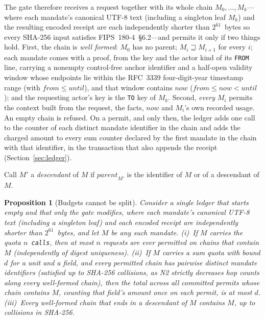 \documentclass[10pt,twocolumn]{article}
\theoremstyle{plain}
\newtheorem{proposition}[theorem]{Proposition}
\theoremstyle{definition}
\newcommand{\covers}{\sqsupseteq}
\begin{document}
The gate therefore receives a request together with its whole chain $M_0, \dots, M_k$---where each mandate's canonical UTF-8 text (including a singleton leaf $M_k$) and the resulting encoded receipt are each independently shorter than $2^{61}$~bytes so every SHA-256 input satisfies FIPS~180-4~\S6.2---and permits it only if two things hold. First, the chain is \emph{well formed}: $M_0$ has no parent; $M_i \covers M_{i+1}$ for every $i$; each mandate comes with a proof, from the key and the actor kind of its \texttt{FROM} line, carrying a nonempty control-free anchor identifier and a half-open validity window whose endpoints lie within the RFC~3339 four-digit-year timestamp range (with $\mathit{from} \le \mathit{until}$), and that window contains $\mathit{now}$ ($\mathit{from} \le \mathit{now} < \mathit{until}$); and the requesting actor's key is the \texttt{TO} key of $M_k$. Second, \emph{every} $M_i$ permits the context built from the request, the facts, $\mathit{now}$ and $M_i$'s own recorded usage. An empty chain is refused. On a permit, and only then, the ledger adds one call to the counter of each distinct mandate identifier in the chain and adds the charged amount to every sum counter declared by the first mandate in the chain with that identifier, in the transaction that also appends the receipt (Section~\ref{sec:ledger}).

Call $M'$ a \emph{descendant} of $M$ if $\mathit{parent}_{M'}$ is the identifier of $M$ or of a descendant of $M$.

\begin{proposition}[Budgets cannot be split]
\label{prop:budget}
Consider a single ledger that starts empty and that only the gate modifies, where each mandate's canonical UTF-8 text (including a singleton leaf) and each encoded receipt are independently shorter than $2^{61}$~bytes, and let $M$ be any such mandate. (i)~If $M$ carries the quota $n$~\texttt{calls}, then at most $n$ requests are ever permitted on chains that contain $M$ (independently of digest uniqueness). (ii)~If $M$ carries a sum quota with bound $d$ for a unit and a field, and every permitted chain has pairwise distinct mandate identifiers (satisfied up to SHA-256 collisions, as N2 strictly decreases hop counts along every well-formed chain), then the total across all committed permits whose chain contains $M$, counting that field's amount once on each permit, is at most $d$. (iii)~Every well-formed chain that ends in a descendant of $M$ contains $M$, up to collisions in SHA-256.
\end{proposition}
\end{document}
